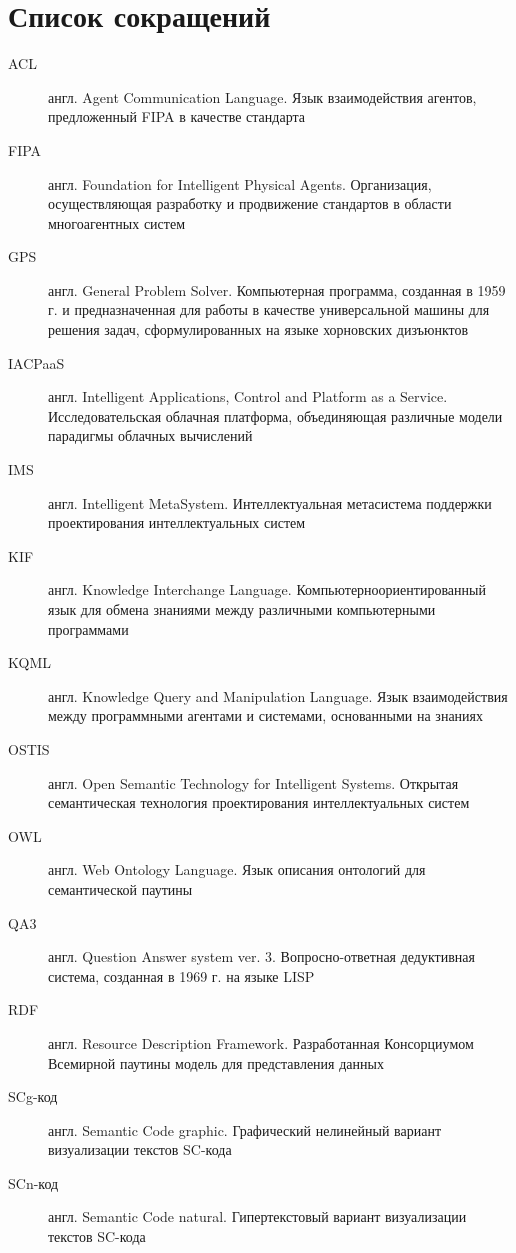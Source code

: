 
\chapter*{\LARGE Список сокращений}
\label{chap_preface}

\begin{description}
\item[ACL] англ. Agent Communication Language. Язык взаимодействия агентов, предложенный FIPA в качестве стандарта
\item[FIPA] англ. Foundation for Intelligent Physical Agents. Организация, осуществляющая разработку и продвижение стандартов в области многоагентных систем
\item[GPS] англ. General Problem Solver. Компьютерная программа, созданная в 1959 г. и предназначенная для работы в качестве универсальной машины для решения задач, сформулированных на языке хорновских дизъюнктов
\item[IACPaaS] англ. Intelligent Applications, Control and Platform as a Service. Исследовательская облачная платформа, объединяющая различные модели парадигмы облачных вычислений
\item[IMS] англ. Intelligent MetaSystem. Интеллектуальная метасистема поддержки проектирования интеллектуальных систем
\item[KIF] англ. Knowledge Interchange Language. Компьютерноориентированный язык для обмена знаниями между различными компьютерными программами
\item[KQML] англ. Knowledge Query and Manipulation Language. Язык взаимодействия между программными агентами и системами, основанными на знаниях
\item[OSTIS] англ. Open Semantic Technology for Intelligent Systems. Открытая семантическая технология проектирования интеллектуальных систем
\item[OWL] англ. Web Ontology Language. Язык описания онтологий для семантической паутины
\item[QA3] англ. Question Answer system ver. 3. Вопросно-ответная дедуктивная система, созданная в 1969 г. на языке LISP
\item[RDF] англ. Resource Description Framework. Разработанная Консорциумом Всемирной паутины модель для представления данных
\item[SCg-код] англ. Semantic Code graphic. Графический нелинейный вариант визуализации текстов SC-кода
\item[SCn-код] англ. Semantic Code natural. Гипертекстовый вариант визуализации текстов SC-кода

\end{description}
